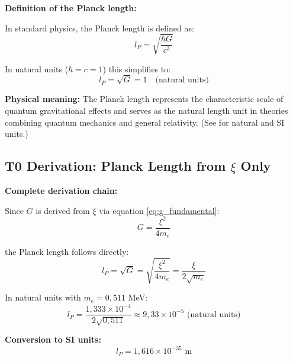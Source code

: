 	\begin{derivation}
		\textbf{Definition of the Planck length:}
		
		In standard physics, the Planck length is defined as:
		\begin{equation}
			l_P = \sqrt{\frac{\hbar G}{c^3}}
			\label{eq:planck_length_standard}
		\end{equation}
		
		In natural units ($\hbar = c = 1$) this simplifies to:
		\begin{equation}
			\boxed{l_P = \sqrt{G} = 1 \quad \text{(natural units)}}
			\label{eq:planck_natural}
		\end{equation}
		
		\textbf{Physical meaning:} The Planck length represents the characteristic scale of quantum gravitational effects and serves as the natural length unit in theories combining quantum mechanics and general relativity. (See \cite{T0_natural_SI_En} for natural and SI units.)
	\end{derivation}
	
	\subsection{T0 Derivation: Planck Length from $\xi$ Only}
	
	\begin{keyresult}
		\textbf{Complete derivation chain:}
		
		Since $G$ is derived from $\xi$ via equation \eqref{eq:g_fundamental}:
		\begin{equation}
			G = \frac{\xi^2}{4 m_e}
		\end{equation}
		
		the Planck length follows directly:
		\begin{equation}
			l_P = \sqrt{G} = \sqrt{\frac{\xi^2}{4 m_e}} = \frac{\xi}{2\sqrt{m_e}}
		\end{equation}
		
		In natural units with $m_e = 0{,}511$ MeV:
		\begin{equation}
			l_P = \frac{1{,}333 \times 10^{-4}}{2\sqrt{0{,}511}} \approx 9{,}33 \times 10^{-5} \text{ (natural units)}
		\end{equation}
		
		\textbf{Conversion to SI units:}
		\begin{equation}
			\boxed{l_P = 1{,}616 \times 10^{-35} \text{ m}}
		\end{equation}
	\end{keyresult}
	
